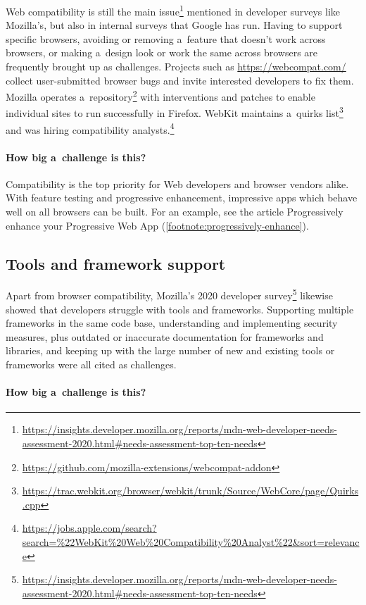 \documentclass[sigconf]{acmart}
\begin{document}
Web compatibility is still the main issue\footnote{\url{https://insights.developer.mozilla.org/reports/mdn-web-developer-needs-assessment-2020.html\#needs-assessment-top-ten-needs}} mentioned in developer surveys like Mozilla's, but also in internal surveys that Google has run. Having to support specific browsers, avoiding or removing a~feature that doesn't work across browsers, or making a~design look or work the same across browsers are frequently brought up as challenges. Projects such as \url{https://webcompat.com/} collect user-submitted browser bugs and invite interested developers to fix them. Mozilla operates a~repository\footnote{\url{https://github.com/mozilla-extensions/webcompat-addon}} with interventions and patches to enable individual sites to run successfully in Firefox. WebKit maintains a~quirks list\footnote{\url{https://trac.webkit.org/browser/webkit/trunk/Source/WebCore/page/Quirks.cpp}} and was hiring compatibility analysts.\footnote{\url{https://jobs.apple.com/search?search=\%22WebKit\%20Web\%20Compatibility\%20Analyst\%22&sort=relevance}}

\paragraph{How big a~challenge is this?}

Compatibility is the top priority for Web developers and browser vendors alike. With feature testing and progressive enhancement, impressive apps which behave well on all browsers can be built. For an example, see the article Progressively enhance your Progressive Web App (\autoref{footnote:progressively-enhance}).

\subsection{Tools and framework support}

Apart from browser compatibility, Mozilla's 2020 developer survey\footnote{\url{https://insights.developer.mozilla.org/reports/mdn-web-developer-needs-assessment-2020.html\#needs-assessment-top-ten-needs}} likewise showed that developers struggle with tools and frameworks. Supporting multiple frameworks in the same code base, understanding and implementing security measures, plus outdated or inaccurate documentation for frameworks and libraries, and keeping up with the large number of new and existing tools or frameworks were all cited as challenges.

\paragraph{How big a~challenge is this?}
\end{document}
